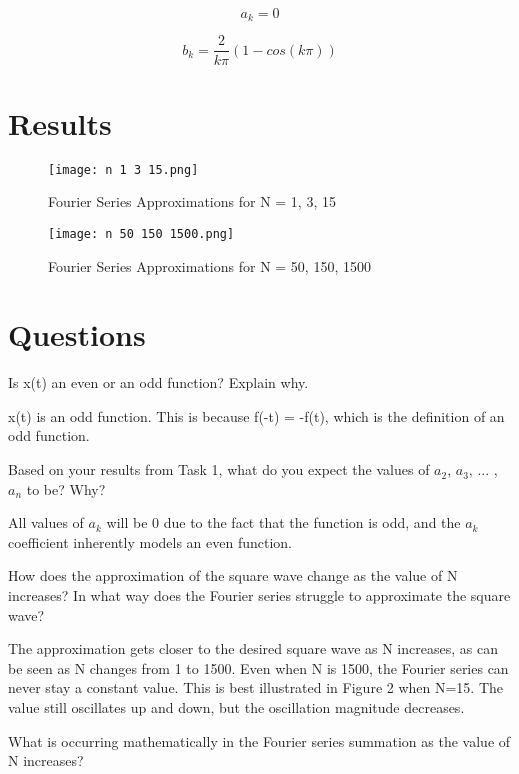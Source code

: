 \documentclass[12pt]{article}
\begin{document}
\begin{equation}
    a_k = 0
\end{equation}

\begin{equation}
    b_k = \frac{2}{k \pi} (1 - cos(k \pi))
\end{equation}

\section{Results}


\begin{figure}[h!]
    \centering
    \texttt{[image: n 1 3 15.png]}
    \caption{Fourier Series Approximations for N = {1, 3, 15}}
\end{figure}

\begin{figure}[h!]
    \centering
    \texttt{[image: n 50 150 1500.png]}
    \caption{Fourier Series Approximations for N = {50, 150, 1500}}
\end{figure}

\section{Questions}

Is x(t) an even or an odd function? Explain why.

x(t) is an odd function. This is because f(-t) = -f(t), which is the definition of an odd function.

Based on your results from Task 1, what do you expect the values of $a_2$, $a_3$, ... , $a_n$ to be? Why?

All values of $a_k$ will be 0 due to the fact that the function is odd, and the $a_k$ coefficient inherently models an even function.

How does the approximation of the square wave change as the value of N increases? In what way does the Fourier series struggle to approximate the square wave?

The approximation gets closer to the desired square wave as N increases, as can be seen as N changes from 1 to 1500. Even when N is 1500, the Fourier series can never stay a constant value. This is best illustrated in Figure 2 when N=15. The value still oscillates up and down, but the oscillation magnitude decreases. 

What is occurring mathematically in the Fourier series summation as the value of N increases?
\end{document}
